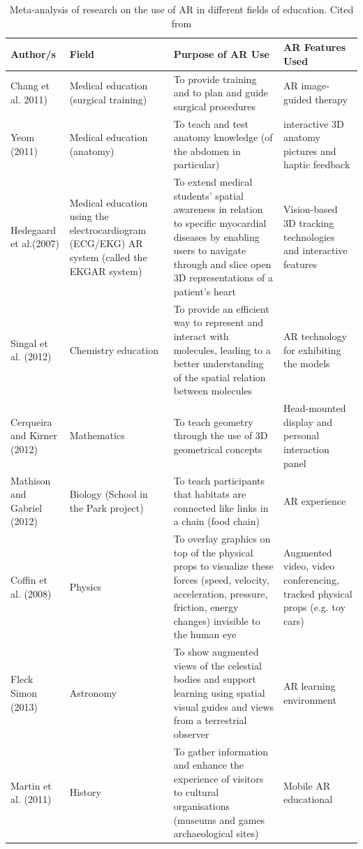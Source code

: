 \documentclass[12 pct]{report}
\begin{document}
\begin{table}[H]
\centering
 \begin{tabular}{||p{20mm} p{30mm} p{40mm} p{30mm}||} 
 \hline
 Author/s & Field & Purpose of AR Use & AR Features Used \\ [0.5ex] 
 \hline\hline
 Chang et al. 2011) & Medical education (surgical training) & To provide training and to plan and guide surgical procedures & AR image-guided therapy \\ 
 Yeom (2011) & Medical education (anatomy) & To teach and test anatomy knowledge (of the abdomen in particular)  & interactive 3D anatomy pictures and haptic feedback \\
 Hedegaard et al.(2007) & Medical education using the electrocardiogram (ECG/EKG) AR system (called the EKGAR system) & To extend medical students’ spatial awareness in relation to specific myocardial diseases by enabling users to navigate through and slice open 3D representations of a patient’s heart & Vision-based 3D tracking technologies and interactive features \\
 Singal et al. (2012) & Chemistry education & To provide an efficient way to represent and interact with molecules, leading to a better understanding of the spatial relation between molecules & AR technology for exhibiting the models \\
 Cerqueira and Kirner (2012) & Mathematics & To teach geometry through the use of 3D geometrical concepts & Head-mounted display and personal interaction panel  \\ 
 Mathison and Gabriel (2012) & Biology (School in the Park project) & To teach participants that habitats are connected like links in a chain (food chain) & AR experience  \\
 Coffin et al. (2008) &  Physics & To overlay graphics on top of the physical props to visualize these forces (speed, velocity, acceleration, pressure, friction, energy changes) invisible to the human eye  & Augmented video, video conferencing, tracked physical props (e.g. toy cars) \\
 Fleck Simon (2013) & Astronomy  & To show augmented views of the celestial bodies and support learning using spatial visual guides and views from a terrestrial observer & AR learning environment \\
 Martin et al. (2011) & History & To gather information and enhance the experience of visitors to cultural organisations (museums and games archaeological sites) & Mobile AR educational \\
 \hline
 \end{tabular}
  \caption{Meta-analysis of research on the use of AR in different fields of education. Cited from \cite{saidinar}  \label{tab:a} }
\end{table}
\end{document}
